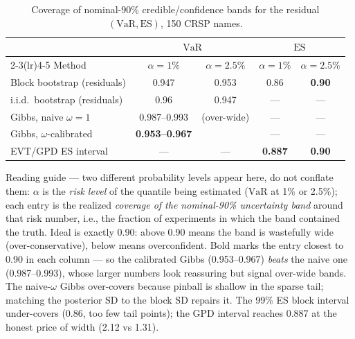 \documentclass[11pt]{article}
\newcommand{\VaR}{\mathrm{VaR}}
\newcommand{\ES}{\mathrm{ES}}
\theoremstyle{remark}
\begin{document}
\begin{table}[t]
\centering
\begin{threeparttable}
\caption{Coverage of nominal-90\% credible/confidence bands for the
residual $(\VaR,\ES)$, 150 CRSP names.}
\label{tab:bands}
\begin{tabular}{lcccc}
\toprule
& \multicolumn{2}{c}{$\VaR$} & \multicolumn{2}{c}{$\ES$} \\
\cmidrule(lr){2-3}\cmidrule(lr){4-5}
Method & $\alpha=1\%$ & $\alpha=2.5\%$ & $\alpha=1\%$ & $\alpha=2.5\%$ \\
\midrule
Block bootstrap (residuals) & 0.947 & 0.953 & 0.86 & \textbf{0.90} \\
i.i.d.\ bootstrap (residuals) & 0.96 & 0.947 & --- & --- \\
Gibbs, naive $\omega=1$ & 0.987--0.993 & (over-wide) & --- & --- \\
Gibbs, $\omega$-calibrated & \textbf{0.953--0.967} & & --- & --- \\
EVT/GPD ES interval & --- & --- & \textbf{0.887} & \textbf{0.90} \\
\bottomrule
\end{tabular}
\begin{tablenotes}\footnotesize
\item Reading guide --- two different probability levels appear here,
do not conflate them: $\alpha$ is the \emph{risk level} of the quantile
being estimated ($\VaR$ at 1\% or 2.5\%); each entry is the realized
\emph{coverage of the nominal-90\% uncertainty band} around that risk
number, i.e., the fraction of experiments in which the band contained
the truth. Ideal is exactly 0.90: above 0.90 means the band is
wastefully wide (over-conservative), below means overconfident. Bold
marks the entry closest to 0.90 in each column --- so the calibrated
Gibbs (0.953--0.967) \emph{beats} the naive one (0.987--0.993), whose
larger numbers look reassuring but signal over-wide bands. The
naive-$\omega$ Gibbs over-covers because pinball
is shallow in the sparse tail; matching the posterior SD to the block
SD repairs it. The 99\% ES block interval under-covers (0.86, too few
tail points); the GPD interval reaches 0.887 at the honest price of
width (2.12 vs 1.31).
\end{tablenotes}
\end{threeparttable}
\end{table}
\end{document}
